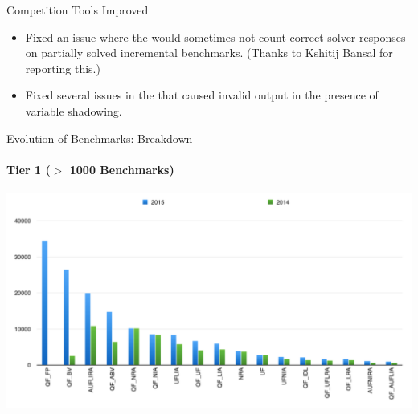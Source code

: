 \documentclass{beamer}
\begin{document}
\begin{frame}{Competition Tools Improved}
  \begin{itemize}
  \item Fixed an issue where the  would
    sometimes not count correct solver responses on partially solved
    incremental benchmarks. (Thanks to Kshitij Bansal for reporting
    this.)

    \bigskip

  \item Fixed several issues in the 
    that caused invalid output in the presence of variable shadowing.
  \end{itemize}

  \bigskip
\end{frame}

\logo{}


\begin{frame}{Evolution of Benchmarks: Breakdown}
\framesubtitle{Tier 1 ($>$ 1000 Benchmarks)}

\begin{center}
\includegraphics[width=\textwidth]{benchmarks-logics-tier1}
\end{center}

\end{frame}

\end{document}
